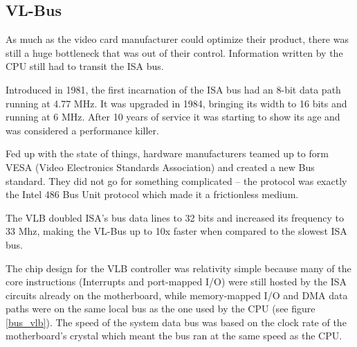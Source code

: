 \subsection{VL-Bus}
As much as the video card manufacturer could optimize their product, there was still a huge bottleneck that was out of their control. Information written by the CPU still had to transit the ISA bus.\\
\par
 Introduced in 1981, the first incarnation of the ISA bus had an 8-bit data path running at 4.77 MHz. It was upgraded in 1984, bringing its width to 16 bits and running at 6 MHz. After 10 years of service it was starting to show its age and was considered a performance killer.\\
\par
{}
\par
Fed up with the state of things, hardware manufacturers teamed up to form VESA (Video Electronics Standards Association) and created a new Bus standard. They did not go for something complicated -- the protocol was exactly the Intel 486 Bus Unit protocol which made it a frictionless medium.\\
\par 
The VLB doubled ISA's bus data lines to 32 bits and increased its frequency to 33 Mhz, making the VL-Bus up to 10x faster when compared to the slowest ISA bus.\\
\par
The chip design for the VLB controller was relativity simple because many of the core instructions (Interrupts and port-mapped I/O) were still hosted by the ISA circuits already on the motherboard, while memory-mapped I/O and DMA data paths were on the same local bus as the one used by the CPU (see figure \ref{bus_vlb}). The speed of the system data bus was based on the clock rate of the motherboard's crystal which meant the bus ran at the same speed as the CPU.\\
\par
{}
\label{vlbarchitecture}


